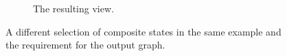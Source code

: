 \documentclass[12pt]{extarticle}
\begin{document}
\begin{figure}[H]
\begin{subfigure}[b]{0.45\textwidth}
        \caption{The resulting view.}
        \label{fig:view2}
    \end{subfigure}
    \caption{A different selection of composite states in the same example and the requirement for the output graph.}
    \label{fig:pandv}
\end{figure}
\end{document}
